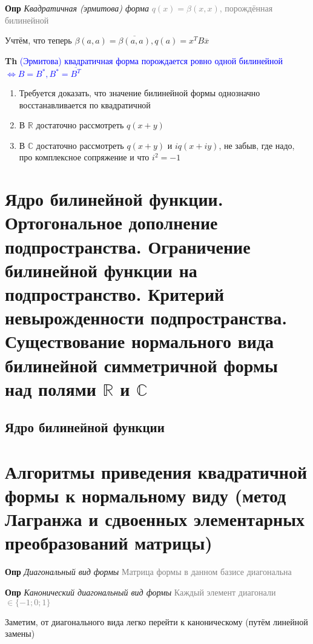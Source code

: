 \documentclass[a4paper, 14pt]{article}
\begin{document}
    \textbf{Опр} \textit{Квадратичная (эрмитова) форма} \textcolor{gray}{$q(x) = \beta (x, x)$, порождённая билинейной}
    
    Учтём, что теперь $\beta (a, a) = \overline{\beta (a, a)}, q(a) =  x^T B \overline{x}$
    
    \textbf{Th} \textcolor{blue}{(Эрмитова) квадратичная форма порождается ровно одной билинейной $\Leftrightarrow B
    = B^*, B^* = \overline{B^T}$}
    
    \begin{enumerate}
        \item Требуется доказать, что значение билинейной формы однозначно восстанавливается по квадратичной
        \item В $\mathbb{R}$ достаточно рассмотреть $q(x + y)$
        \item В $\mathbb{C}$ достаточно рассмотреть $q(x + y)$ и $iq(x + iy)$, не забыв, где надо, про
        комплексное сопряжение и что $i^2 = -1$
    \end{enumerate}
    
    \section{Ядро билинейной функции.
    Ортогональное дополнение подпространства.
    Ограничение билинейной функции на подпространство.
    Критерий невырожденности подпространства.
    Существование нормального вида билинейной симметричной формы над полями $\mathbb{R}$ и $\mathbb{C}$}
    
    \subsection{Ядро билинейной функции}
    
    \section{Алгоритмы приведения квадратичной формы к нормальному виду (метод Лагранжа и сдвоенных элементарных
    преобразований матрицы)}
    
    \textbf{Опр} \textit{Диагональный вид формы} \textcolor{gray}{Матрица формы в данном базисе диагональна}
    
    \textbf{Опр} \textit{Канонический диагональный вид формы} \textcolor{gray}{Каждый элемент диагонали $\in \{-1;0;1\}$}
    
    Заметим, от диагонального вида легко перейти к каноническому (путём линейной замены)
    
\end{document}
